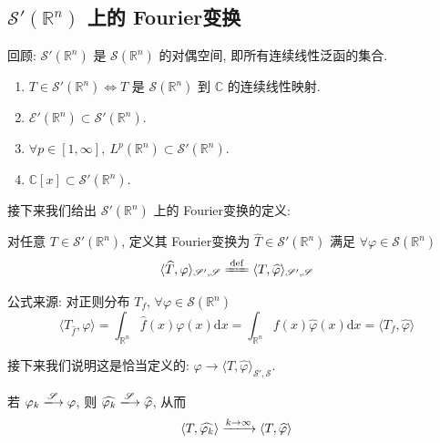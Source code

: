 \documentclass[11pt]{ctexart}[UTF8]
\begin{document}
\subsection{$\mathscr{S}'(\mathbb{R}^{n})$ 上的 Fourier变换}
回顾: $\mathscr{S}'(\mathbb{R}^{n})$ 是 $\mathscr{S}(\mathbb{R}^{n})$ 的对偶空间, 即所有连续线性泛函的集合.
\begin{enumerate}
    \item $T \in \mathscr{S}'(\mathbb{R}^{n}) \Leftrightarrow T$ 是 $\mathscr{S}(\mathbb{R}^{n})$ 到 $\mathbb{C}$ 的连续线性映射.
    \item $\mathscr{E}'(\mathbb{R}^{n}) \subset \mathscr{S}'(\mathbb{R}^{n})$.
    \item $\forall p \in [1, \infty],\ L^p(\mathbb{R}^{n}) \subset \mathscr{S}'(\mathbb{R}^{n})$.
    \item $\mathbb{C}[x] \subset \mathscr{S}'(\mathbb{R}^{n})$.
\end{enumerate}
接下来我们给出 $\mathscr{S}'(\mathbb{R}^{n})$ 上的 Fourier变换的定义:
\begin{definition}[Fourier变换]
    对任意 $T \in \mathscr{S}'(\mathbb{R}^{n})$, 定义其 Fourier变换为 $\widehat{T} \in \mathscr{S}'(\mathbb{R}^{n})$ 满足 $\forall \varphi \in \mathscr{S}(\mathbb{R}^{n})$
    \begin{equation*}        
        \langle \widehat{T}, \varphi \rangle_{\mathscr{S}',\mathscr{S}} \xlongequal{\mathrm{def}} \langle T, \widehat{\varphi} \rangle_{\mathscr{S}',\mathscr{S}}
    \end{equation*}
\end{definition}
\begin{remark}
    公式来源: 对正则分布 $T_{f}$, $\forall \varphi \in \mathscr{S}(\mathbb{R}^{n})$
    \begin{equation*}
        \langle T_{\widehat{f}}, \varphi \rangle = \int_{\mathbb{R}^{n}} \widehat{f}(x) \varphi(x) \mathrm{d}x = \int_{\mathbb{R}^{n}} f(x) \widehat{\varphi}(x) \mathrm{d}x = \langle T_{f}, \widehat{\varphi} \rangle
    \end{equation*}
\end{remark}
接下来我们说明这是恰当定义的: $\varphi \longrightarrow \langle T, \widehat{\varphi} \rangle_{\mathscr{S}',\mathscr{S}}$.\par
若 $\varphi_{k} \xlongrightarrow{\mathscr{S}} \varphi$, 则 $\widehat{\varphi_{k}} \xlongrightarrow{\mathscr{S}} \widehat{\varphi}$, 从而
\begin{equation*}
    \langle T, \widehat{\varphi_{k}} \rangle \xlongrightarrow{k \to \infty} \langle T, \widehat{\varphi} \rangle
\end{equation*}
\end{document}
